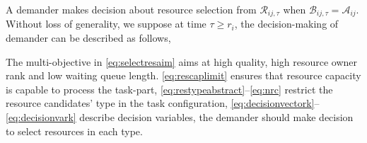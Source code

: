 A demander makes decision about resource selection from $\mathcal{R}_{ij,\tau}$ when $\mathcal{B}_{ij,\tau} = \mathcal{A}_{ij}$. Without loss of generality, we suppose at time $\tau \ge r_i$, the decision-making of demander can be described as follows,

The multi-objective in \autoref{eq:selectresaim} aims at high quality, high resource owner rank and low waiting queue length. \autoref{eq:rescaplimit} ensures that resource capacity is capable to process the task-part, \autoref{eq:restypeabstract}--\ref{eq:nrc} restrict the resource candidates' type in the task configuration, \autoref{eq:decisionvectork}--\ref{eq:decisionvark} describe decision variables, the demander should make decision to select resources in each type.

